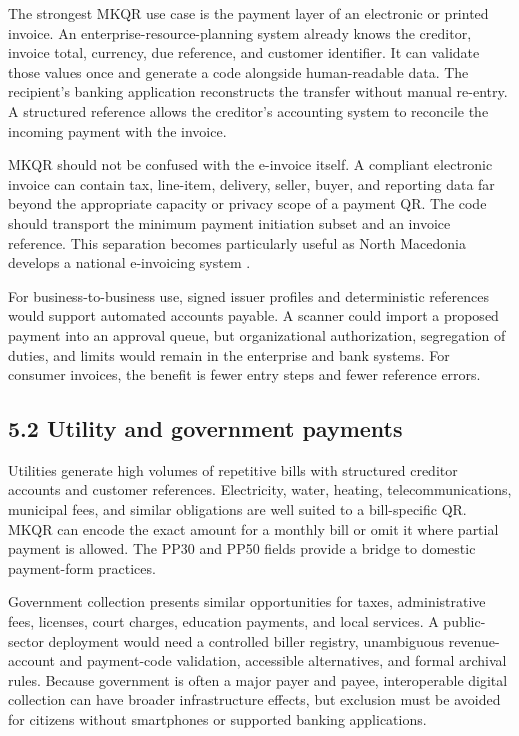 The strongest MKQR use case is the payment layer of an electronic or printed invoice. An enterprise-resource-planning system already knows the creditor, invoice total, currency, due reference, and customer identifier. It can validate those values once and generate a code alongside human-readable data. The recipient's banking application reconstructs the transfer without manual re-entry. A structured reference allows the creditor's accounting system to reconcile the incoming payment with the invoice.

MKQR should not be confused with the e-invoice itself. A compliant electronic invoice can contain tax, line-item, delivery, seller, buyer, and reporting data far beyond the appropriate capacity or privacy scope of a payment QR. The code should transport the minimum payment initiation subset and an invoice reference. This separation becomes particularly useful as North Macedonia develops a national e-invoicing system \cite{mofeinvoice}.

For business-to-business use, signed issuer profiles and deterministic references would support automated accounts payable. A scanner could import a proposed payment into an approval queue, but organizational authorization, segregation of duties, and limits would remain in the enterprise and bank systems. For consumer invoices, the benefit is fewer entry steps and fewer reference errors.

\subsection{5.2 Utility and government payments}

Utilities generate high volumes of repetitive bills with structured creditor accounts and customer references. Electricity, water, heating, telecommunications, municipal fees, and similar obligations are well suited to a bill-specific QR. MKQR can encode the exact amount for a monthly bill or omit it where partial payment is allowed. The PP30 and PP50 fields provide a bridge to domestic payment-form practices.

Government collection presents similar opportunities for taxes, administrative fees, licenses, court charges, education payments, and local services. A public-sector deployment would need a controlled biller registry, unambiguous revenue-account and payment-code validation, accessible alternatives, and formal archival rules. Because government is often a major payer and payee, interoperable digital collection can have broader infrastructure effects, but exclusion must be avoided for citizens without smartphones or supported banking applications.

